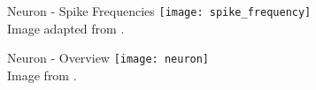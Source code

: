 \begin{frame}[c]{Neuron - Spike Frequencies}
    \texttt{[image: spike\_frequency]} \\
    \normalsize
    Image adapted from \cite{yi2019average}.
\end{frame}


\begin{frame}[c]{Neuron - Overview}
    \texttt{[image: neuron]} \\
    Image from \cite{figneuron}.
\end{frame}

